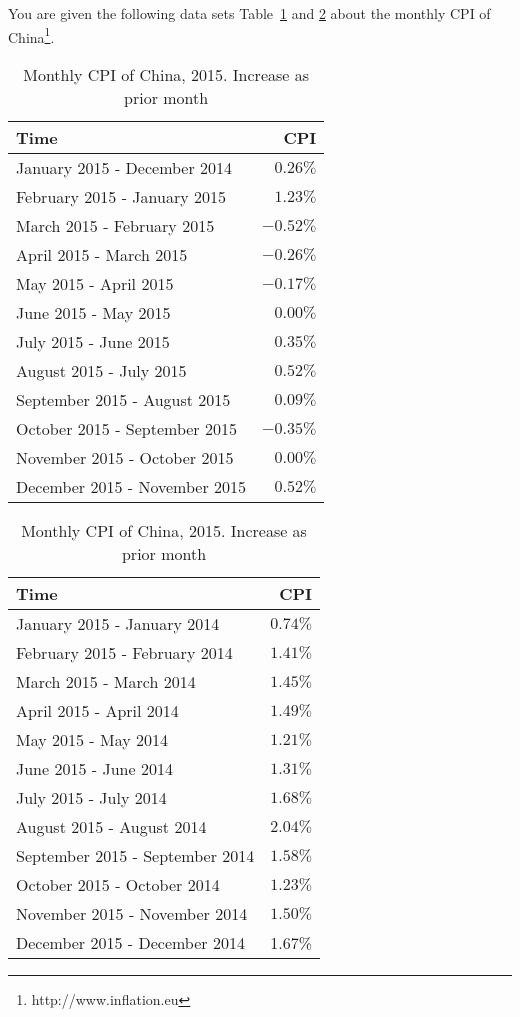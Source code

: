 \documentclass[11pt, nocap, fleqn,a4paper,twoside]{article}
\begin{document}
You are given the following data sets Table~\ref{tab.1} and \ref{tab.2} about the monthly CPI of China\footnote{http://www.inflation.eu}.
\begin{table}[H]
\centering
\caption{Monthly CPI of China, 2015.  Increase as prior month}
\label{tab.1}
\begin{tabular}{l|r} \hline
Time  & CPI \\ \hline
January 2015 - December 2014  & $0.26\%$  \\
February 2015 - January 2015    & $1.23\%$  \\
March 2015 - February 2015       & $-0.52\%$   \\
April 2015 - March 2015              & $-0.26\% $\\
May 2015 - April 2015 &           $ -0.17\%$ \\
June 2015 - May 2015 & $0.00\%$ \\
July 2015 - June 2015 & $0.35\%$ \\
August 2015 - July 2015 & $0.52\%$\\
September 2015 - August 2015  & $0.09\%$\\
October 2015 - September 2015 & $-0.35\%$\\
November 2015 - October 2015 & $0.00\%$  \\
December 2015 - November 2015 & $0.52\%$ \\ \hline
 \end{tabular}
 \end{table}

\begin{table}[H]
\centering
\caption{Monthly CPI of China, 2015.  Increase as prior month}
\label{tab.2}
\begin{tabular}{l|r} \hline
Time  & CPI \\ \hline
January 2015 - January 2014	& $0.74\%$\\
February 2015 - February 2014	& $1.41\%$\\
March 2015 - March 2014	& $1.45\%$\\
April 2015 - April 2014	& $1.49\%$\\
May 2015 - May 2014	& $1.21\%$\\
June 2015 - June 2014	& $1.31\%$\\
July 2015 - July 2014	& $1.68\%$\\
August 2015 - August 2014 & $2.04\%$\\
September 2015 - September 2014 & $1.58\%$\\
October 2015 - October 2014 & $1.23\%$\\
November 2015 - November 2014 & $1.50\%$\\
December 2015 - December 2014 &1.67\% \\ \hline
 \end{tabular}
\end{table}
\end{document}
